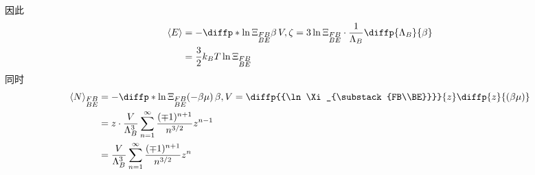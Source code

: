 因此\begin{equation}
    \begin{aligned}
        \braket{E}&=-\diffp*{{\ln \Xi_{\substack{FB\\BE}}}}{\beta}{\, V,\zeta} =3 \ln \Xi_{\substack{FB\\BE}} \cdot \frac{1}{\Lambda_B} \diffp{\Lambda_B}{\beta}\\
        &=\frac{3}{2}k_B T\ln \Xi_{\substack{FB\\BE}} 
    \end{aligned}
\end{equation}
同时\begin{equation}
    \begin{aligned}
        \braket{N}_{\substack{FB\\BE}}&=-\diffp*{{\ln \Xi_{\substack{FB\\BE}}}}{{(-\beta\mu)}}{\, \beta, V} =\diffp{{\ln \Xi_{\substack{FB\\BE}}}}{z} \diffp{z}{{(\beta\mu)}} \\
        &= z \cdot \frac{V}{\Lambda_B^3} \sum_{n=1}^{\infty}\frac{(\mp 1)^{n+1}}{n^{3/2}} z^{n-1}\\
        &=\frac{V}{\Lambda_B^3} \sum_{n=1}^{\infty}\frac{(\mp 1)^{n+1}}{n^{3/2}} z^{n}\\
    \end{aligned}
\end{equation}

